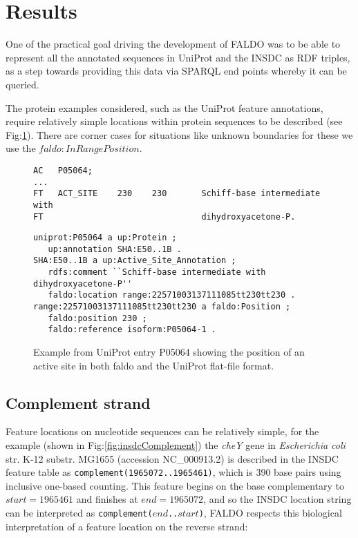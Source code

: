 \section*{Results}
One of the practical goal driving the development of FALDO was to be able
to represent all the annotated sequences in UniProt and the INSDC as RDF
triples, as a step towards providing this data via SPARQL end points whereby
it can be queried.

The protein examples considered, such as the UniProt feature annotations,
require relatively simple locations within protein sequences to be described (see Fig:\ref{fig:UniProt}).
There are corner cases for situations like unknown boundaries for these we use the $faldo:InRangePosition$.

\begin{figure}
\begin{verbatim}
AC   P05064;
...
FT   ACT_SITE    230    230       Schiff-base intermediate with
FT                                dihydroxyacetone-P.
\end{verbatim}
\begin{verbatim}
uniprot:P05064 a up:Protein ;
   up:annotation SHA:E50..1B .
SHA:E50..1B a up:Active_Site_Annotation ;
   rdfs:comment ``Schiff-base intermediate with dihydroxyacetone-P''
   faldo:location range:22571003137111085tt230tt230 .
range:22571003137111085tt230tt230 a faldo:Position ;
   faldo:position 230 ;
   faldo:reference isoform:P05064-1 .
\end{verbatim}
\caption{Example from UniProt entry P05064 showing the position of an active site in both faldo and the UniProt flat-file format.}
\label{fig:UniProt}
\end{figure}
\subsection*{Complement strand}
Feature locations on nucleotide sequences can be relatively simple,
for the example (shown in Fig:\ref{fig:insdcComplement}) the \textit{cheY} gene in
\textit{Escherichia coli} str. K-12 substr. MG1655 (accession NC\_000913.2)
is described in the INSDC feature table as \texttt{complement(1965072..1965461)},
which is 390 base pairs using inclusive one-based counting.
This feature begins on the base complementary to $start = 1965461$
and finishes at $end = 1965072$, and so the INSDC location string
can be interpreted as \texttt{complement($end$..$start$)},
FALDO respects this biological interpretation of a feature location
on the reverse strand:

